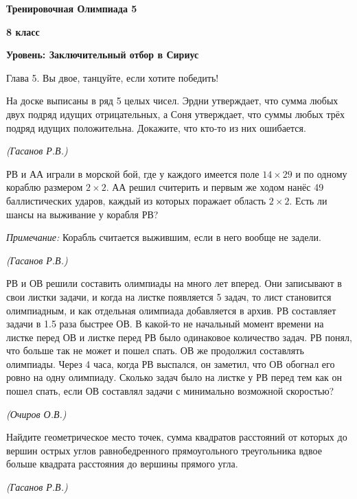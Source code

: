 \centerline{\Huge \bf  Тренировочная Олимпиада 5}
\centerline{\Huge \bf 8 класс}
\centerline{\Huge \bf Уровень: Заключительный отбор в Сириус}

\begin{flushright}
    \scriptsize{Глава 5. Вы двое, танцуйте, если хотите победить!}
\end{flushright}

На доске выписаны в ряд 5 целых чисел. Эрдни утверждает, что сумма любых двух подряд идущих отрицательных, а Соня утверждает, что суммы любых трёх подряд идущих положительна. Докажите, что кто-то из них ошибается.
\begin{flushright}
    \textit{\small{(Гасанов Р.В.)}}
\end{flushright}

РВ и АА играли в морской бой, где у каждого имеется поле $14 \times 29$ и по одному кораблю размером $2\times 2$. АА решил считерить и первым же ходом нанёс 49 баллистических ударов, каждый из которых поражает область $2\times 2$. Есть ли шансы на выживание у корабля РВ?

\textit{Примечание:} Корабль считается выжившим, если в него вообще не задели.
\begin{flushright}
    \textit{\small{(Гасанов Р.В.)}}
\end{flushright}

РВ и ОВ решили составить олимпиады на много лет вперед. Они записывают в свои листки задачи, и когда на листке появляется 5 задач, то лист становится олимпиадным, и как отдельная олимпиада добавляется в архив. РВ составляет задачи в 1.5 раза быстрее ОВ. В какой-то не начальный момент времени на листке перед ОВ и листке перед РВ было одинаковое количество задач. РВ понял, что больше так не может и пошел спать. ОВ же продолжил составлять олимпиады. Через 4 часа, когда РВ выспался, он заметил, что ОВ обогнал его ровно на одну олимпиаду. Сколько задач было на листке у РВ перед тем как он пошел спать, если ОВ составлял задачи с минимально возможной скоростью?
\begin{flushright}
    \textit{\small{(Очиров О.В.)}}
\end{flushright}

Найдите геометрическое место точек, сумма квадратов расстояний от которых до вершин острых углов равнобедренного прямоугольного треугольника вдвое больше квадрата расстояния до вершины прямого угла.
\begin{flushright}
    \textit{\small{(Гасанов Р.В.)}}
\end{flushright}


